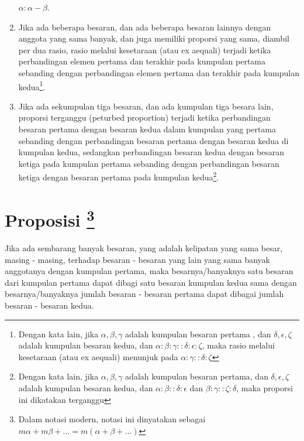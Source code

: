 \documentclass[a4paper]{book}
\begin{document}
\begin{enumerate}
{$\alpha: \alpha - \beta$}.
\item Jika ada beberapa besaran, dan ada beberapa besaran lainnya dengan 
anggota yang sama banyak, dan juga memiliki proporsi yang sama, diambil per 
dua rasio, rasio melalui kesetaraan (atau ex aequali) terjadi ketika perbandingan 
elemen pertama dan terakhir pada kumpulan pertama sebanding dengan 
perbandingan elemen pertama dan terakhir pada kumpulan kedua\footnote{
Dengan kata lain, jika $\alpha, \beta, \gamma$ adalah kumpulan besaran pertama
, dan $\delta, \epsilon , \zeta$ adalah kumpulan besaran kedua, dan 
$\alpha:\beta:\gamma::\delta:\epsilon:\zeta$, maka rasio melalui kesetaraan
(atau ex aequali) menunjuk pada $\alpha:\gamma::\delta:\zeta$}.
\item Jika ada sekumpulan tiga besaran, dan ada kumpulan tiga besara lain, 
proporsi terganggu (peturbed proportion) terjadi ketika perbandingan besaran
pertama dengan besaran kedua dalam kumpulan yang pertama sebanding dengan
perbandingan besaran pertama dengan besaran kedua di kumpulan kedua, sedangkan
perbandingan besaran kedua dengan besaran ketiga pada kumpulan pertama 
sebanding dengan perbandingan besaran ketiga dengan besaran pertama pada 
kumpulan kedua\footnote{Dengan kata lain, jika $\alpha, \beta, \gamma$ adalah
kumpulan besaran pertama, dan $\delta, \epsilon, \zeta$ adalah kumpulan
besaran kedua, dan $\alpha:\beta::\delta:\epsilon$ 
dan $\beta:\gamma::\zeta:\delta$, maka proporsi ini dikatakan terganggu}.  
\end{enumerate}

\section*{\centering Proposisi \thesection\footnote{Dalam notasi modern, 
notasi ini dinyatakan sebagai $m\alpha + m\beta + ... = m(\alpha+\beta+...)$}}
Jika ada sembarang banyak besaran, yang adalah kelipatan yang sama besar,  
masing - masing, terhadap besaran - besaran yang lain yang sama banyak anggotanya dengan kumpulan pertama, maka besarnya/banyaknya satu besaran dari 
kumpulan pertama dapat dibagi satu besaran kumpulan kedua sama dengan 
besarnya/banyaknya jumlah besaran - besaran pertama dapat dibagai jumlah 
besaran - besaran kedua. 

\begin{center} 
\end{center} 
\end{document}
